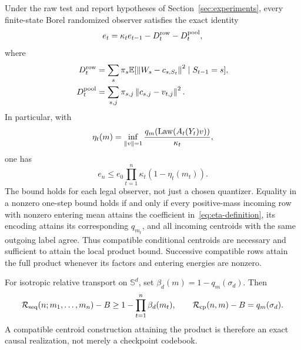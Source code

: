 \begin{theorem}\label{thm:energy}
Under the raw test and report hypotheses of Section~\ref{sec:experiments}, every finite-state Borel randomized observer satisfies the exact identity
\begin{equation}\label{eq:energy-identity}
 e_t=\kappa_t e_{t-1}-D_t^{\rm row}-D_t^{\rm pool},
\end{equation}
where
\begin{align}
 D_t^{\rm row}&=\sum_s\pi_s\mathbb E[\left\lVert W_s-c_{s,S_t}\right\rVert^2\mid S_{t-1}=s],\label{eq:row-defect}\\
 D_t^{\rm pool}&=\sum_{s,j}\pi_{s,j}\left\lVert c_{s,j}-v_{t,j}\right\rVert^2.\label{eq:pool-defect}
\end{align}
In particular, with
\begin{equation}\label{eq:eta-definition}
 \eta_t(m)=\inf_{\left\lVert v\right\rVert=1}\frac{q_m(\operatorname{Law}(A_t(Y_t)v))}{\kappa_t},
\end{equation}
one has
\begin{equation}\label{eq:energy-product}
 e_n\le e_0\prod_{t=1}^n\kappa_t(1-\eta_t(m_t)).
\end{equation}
The bound holds for each legal observer, not just a chosen quantizer. Equality in a nonzero one-step bound holds if and only if every positive-mass incoming row with nonzero entering mean attains the coefficient in~\eqref{eq:eta-definition}, its encoding attains its corresponding $q_{m_t}$, and all incoming centroids with the same outgoing label agree. Thus compatible conditional centroids are necessary and sufficient to attain the local product bound. Successive compatible rows attain the full product whenever its factors and entering energies are nonzero.

For isotropic relative transport on $\mathbb S^d$, set $\beta_d(m)=1-q_m(\sigma_d)$. Then
\begin{equation}\label{eq:orbit-product-lower}
 \mathcal R_{\rm seq}(n;m_1,\ldots,m_n)-B
 \ge1-\prod_{t=1}^n\beta_d(m_t),
 \qquad \mathcal R_{\rm cp}(n,m)-B=q_m(\sigma_d).
\end{equation}
A compatible centroid construction attaining the product is therefore an exact causal realization, not merely a checkpoint codebook.
\end{theorem}
